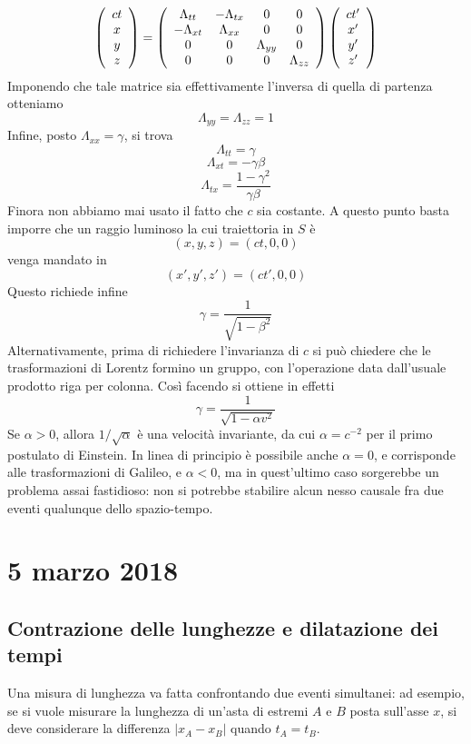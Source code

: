\documentclass[a4paper,11pt]{book}
\theoremstyle{theorem}
\theoremstyle{definition}
\begin{document}
\[\left(\begin{array}{c}
ct\\x\\y\\z
\end{array}\right)=\left(\begin{array}{c c c c}
\Lambda_{tt}&-\Lambda_{tx}&0&0\\
-\Lambda_{xt}&\Lambda_{xx}&0&0\\
0&0&\Lambda_{yy}&0\\
0&0&0&\Lambda_{zz}
\end{array}\right)\left(\begin{array}{c}
ct'\\x'\\y'\\z'
\end{array}\right)\]
Imponendo che tale matrice sia effettivamente l'inversa di quella di partenza otteniamo
\[\Lambda_{yy}=\Lambda_{zz}=1\]
Infine, posto $\Lambda_{xx}=\gamma$, si trova
\[\Lambda_{tt}=\gamma\]
\[\Lambda_{xt}=-\gamma\beta\]
\[\Lambda_{tx}=\frac{1-\gamma^2}{\gamma\beta}\]
Finora non abbiamo mai usato il fatto che $c$ sia costante. A questo punto basta imporre che un raggio luminoso la cui traiettoria in $S$ è
\[(x,y,z)=(ct,0,0)\]
venga mandato in
\[(x',y',z')=(ct',0,0)\]
Questo richiede infine
\[\gamma=\frac{1}{\sqrt{1-\beta^2}}\]
Alternativamente, prima di richiedere l'invarianza di $c$ si può chiedere che le trasformazioni di Lorentz formino un gruppo, con l'operazione data dall'usuale prodotto riga per colonna. Così facendo si ottiene in effetti
\[\gamma=\frac{1}{\sqrt{1-\alpha v^2}}\]
Se $\alpha>0$, allora $1/\sqrt{\alpha}$ è una velocità invariante, da cui $\alpha=c^{-2}$ per il primo postulato di Einstein. In linea di principio è possibile anche $\alpha=0$, e corrisponde alle trasformazioni di Galileo, e $\alpha<0$, ma in quest'ultimo caso sorgerebbe un problema assai fastidioso: non si potrebbe stabilire alcun nesso causale fra due eventi qualunque dello spazio-tempo.
\newpage
\section{5 marzo 2018}
\subsection{Contrazione delle lunghezze e dilatazione dei tempi}
Una misura di lunghezza va fatta confrontando due eventi simultanei: ad esempio, se si vuole misurare la lunghezza di un'asta di estremi $A$ e $B$ posta sull'asse $x$, si deve considerare la differenza $|x_A-x_B|$ quando $t_A=t_B$. 
\end{document}
